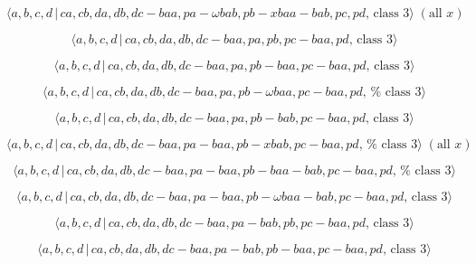 \documentclass[10pt]{article}
\begin{document}
\begin{equation}
\langle a,b,c,d\,|\,ca,cb,da,db,dc-baa,pa-\omega bab,pb-xbaa-bab,pc,pd,\,%
\text{class }3\rangle \;(\text{all }x)  \tag{7.3453}
\end{equation}

\begin{equation}
\langle a,b,c,d\,|\,ca,cb,da,db,dc-baa,pa,pb,pc-baa,pd,\,\text{class }%
3\rangle  \tag{7.3454}
\end{equation}

\begin{equation}
\langle a,b,c,d\,|\,ca,cb,da,db,dc-baa,pa,pb-baa,pc-baa,pd,\,\text{class }%
3\rangle  \tag{7.3455}
\end{equation}

\begin{equation}
\langle a,b,c,d\,|\,ca,cb,da,db,dc-baa,pa,pb-\omega baa,pc-baa,pd,\,\text{%
class }3\rangle  \tag{7.3456}
\end{equation}

\begin{equation}
\langle a,b,c,d\,|\,ca,cb,da,db,dc-baa,pa,pb-bab,pc-baa,pd,\,\text{class }%
3\rangle  \tag{7.3457}
\end{equation}

\begin{equation}
\langle a,b,c,d\,|\,ca,cb,da,db,dc-baa,pa-baa,pb-xbab,pc-baa,pd,\,\text{%
class }3\rangle \;(\text{all }x)  \tag{7.3458}
\end{equation}

\begin{equation}
\langle a,b,c,d\,|\,ca,cb,da,db,dc-baa,pa-baa,pb-baa-bab,pc-baa,pd,\,\text{%
class }3\rangle  \tag{7.3459}
\end{equation}

\begin{equation}
\langle a,b,c,d\,|\,ca,cb,da,db,dc-baa,pa-baa,pb-\omega baa-bab,pc-baa,pd,\,%
\text{class }3\rangle  \tag{7.3460}
\end{equation}

\begin{equation}
\langle a,b,c,d\,|\,ca,cb,da,db,dc-baa,pa-bab,pb,pc-baa,pd,\,\text{class }%
3\rangle  \tag{7.3461}
\end{equation}

\begin{equation}
\langle a,b,c,d\,|\,ca,cb,da,db,dc-baa,pa-bab,pb-baa,pc-baa,pd,\,\text{class 
}3\rangle  \tag{7.3462}
\end{equation}
\end{document}
